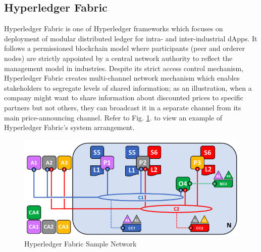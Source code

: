 \documentclass[a4paper,12pt,oneside, utf8x]{report}
\begin{document}
\subsection{Hyperledger Fabric \cite{h25,h26}}
Hyperledger Fabric is one of Hyperledger frameworks which focuses on deployment of modular distributed ledger for intra- and inter-industrial dApps. It follows a permissioned blockchain model where participants (peer and orderer nodes) are strictly appointed by a central network authority to reflect the management model in industries. Despite its strict access control mechanism, Hyperledger Fabric creates multi-channel network mechanism which enables stakeholders to segregate levels of shared information; as an illustration, when a company might want to share information about discounted prices to specific partners but not others, they can broadcast it in a separate channel from its main price-announcing channel. Refer to Fig. \ref{f32}. to view an example of Hyperledger Fabric’s system arrangement.

    \begin{figure}[H]
        \centering
        \includegraphics[width=.96\textwidth]{figures/3-2.png}
        \caption{Hyperledger Fabric Sample Network \cite{h26}}
        \label{f32}
    \end{figure}
    
\end{document}
